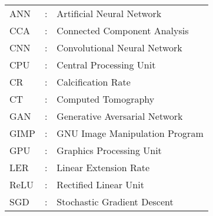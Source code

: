 \begin{tabular}{lcl}
ANN                 &:     & Artificial Neural Network \\
CCA                 &:     & Connected Component Analysis \\
CNN                 &:     & Convolutional Neural Network \\
CPU                 &:     & Central Processing Unit \\
CR                  &:     & Calcification Rate \\
CT                  &:     & Computed Tomography \\
GAN                 &:     & Generative Aversarial Network \\
GIMP                &:     & GNU Image Manipulation Program \\
GPU                 &:     & Graphics Processing Unit \\
LER                 &:     & Linear Extension Rate \\
ReLU                &:     & Rectified Linear Unit \\
SGD                 &:     & Stochastic Gradient Descent \\
\end{tabular}